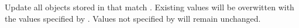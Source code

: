 Update all objects stored in  that match .  Existing
values will be overwitten with the values specified by .  Values not
specified by  will remain unchanged.


